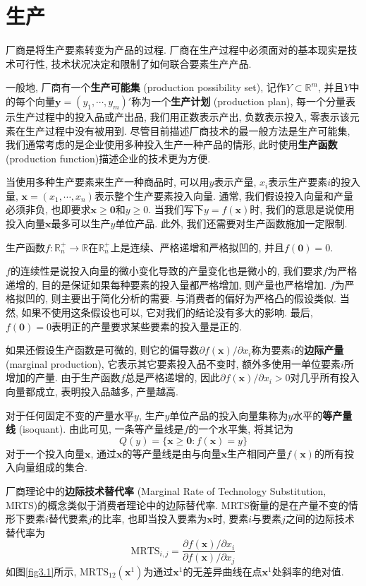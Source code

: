 \documentclass[cn, 12pt, math=mtpro2, bibstyle=apa, blue]{elegantbook}
\newcommand{\R}{\mathbb{R}}
\newcommand{\x}{\mathbf{x}}
\begin{document}
\section{生产}
厂商是将生产要素转变为产品的过程. 厂商在生产过程中必须面对的基本现实是技术可行性, 技术状况决定和限制了如何联合要素生产产品.

一般地, 厂商有一个\textbf{生产可能集} (production possibility set), 记作$Y\subset\R^m$, 并且$Y$中的每个向量$\mathbold{y}=(y_1,\cdots,y_m)'$称为一个\textbf{生产计划} (production plan), 每一个分量表示生产过程中的投入品或产出品, 我们用正数表示产出, 负数表示投入, 零表示该元素在生产过程中没有被用到. 尽管目前描述厂商技术的最一般方法是生产可能集, 我们通常考虑的是企业使用多种投入生产一种产品的情形, 此时使用\textbf{生产函数} (production function)描述企业的技术更为方便.

当使用多种生产要素来生产一种商品时, 可以用$y$表示产量, $x_i$表示生产要素$i$的投入量, $\x=(x_1,\cdots,x_n)$表示整个生产要素投入向量. 通常, 我们假设投入向量和产量必须非负, 也即要求$\x\ge \mathbf{0}$和$y\ge0$. 当我们写下$y=f(\x)$时, 我们的意思是说使用投入向量$\x$最多可以生产$y$单位产品. 此外, 我们还需要对生产函数施加一定限制.

\begin{definition}[生产函数]\label{def:def3.1}
生产函数$f:\R_n^+\to\R$在$\R_n^+$上是连续、严格递增和严格拟凹的, 并且$f(\mathbf{0})=0$.
\end{definition}

$f$的连续性是说投入向量的微小变化导致的产量变化也是微小的, 我们要求$f$为严格递增的, 目的是保证如果每种要素的投入量都严格增加, 则产量也严格增加. $f$为严格拟凹的, 则主要出于简化分析的需要. 与消费者的偏好为严格凸的假设类似. 当然, 如果不使用这条假设也可以, 它对我们的结论没有多大的影响. 最后, $f(\mathbf{0})=0$表明正的产量要求某些要素的投入量是正的.

如果还假设生产函数是可微的, 则它的偏导数$\partial f(\x)/\partial x_i$称为要素$i$的\textbf{边际产量} (marginal production), 它表示其它要素投入品不变时, 额外多使用一单位要素$i$所增加的产量. 由于生产函数$f$总是严格递增的, 因此$\partial f(\x)/\partial x_i>0$对几乎所有投入向量都成立, 表明投入品越多, 产量越高.

对于任何固定不变的产量水平$y$, 生产$y$单位产品的投入向量集称为$y$水平的\textbf{等产量线} (isoquant). 由此可见, 一条等产量线是$f$的一个水平集, 将其记为
$$Q(y)=\{\x\ge\mathbf{0}:f(\x)=y\}$$
对于一个投入向量$\x$, 通过$\x$的等产量线是由与向量$\x$生产相同产量$f(\x)$的所有投入向量组成的集合.

厂商理论中的\textbf{边际技术替代率} (Marginal Rate of Technology Substitution, MRTS)的概念类似于消费者理论中的边际替代率. MRTS衡量的是在产量不变的情形下要素$i$替代要素$j$的比率, 也即当投入要素为$\x$时, 要素$i$与要素$j$之间的边际技术替代率为
$$\text{MRTS}_{i,j}=\frac{\partial f(\x)/\partial x_i}{\partial f(\x)/\partial x_j}$$
如图\ref{fig3.1}所示, $\text{MRTS}_{12}(\x^1)$为通过$\x^1$的无差异曲线在点$\x^1$处斜率的绝对值.
\end{document}
